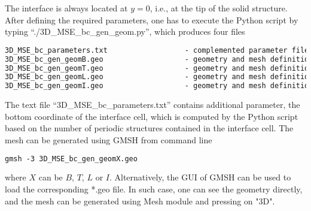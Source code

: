 \documentclass[12pt,a4paper]{article}
\begin{document}
The interface is always located at $y = 0$, i.e., at the tip of the solid structure. After defining the required parameters, one has to execute the Python script by typing ``./3D\_MSE\_bc\_gen\_geom.py'', which produces four files
\begin{lstlisting}[language=tex]
3D_MSE_bc_parameters.txt                  - complemented parameter file for FreeFem++ solver
3D_MSE_bc_gen_geomB.geo                   - geometry and mesh definition for bottom part of interface cell
3D_MSE_bc_gen_geomT.geo                   - geometry and mesh definition for top part of interface cell
3D_MSE_bc_gen_geomL.geo                   - geometry and mesh definition for Lagrange multipliers
3D_MSE_bc_gen_geomI.geo                   - geometry and mesh definition for interior cell
\end{lstlisting}
The text file ``3D\_MSE\_bc\_parameters.txt'' contains additional parameter, the bottom coordinate of the interface cell, which is computed by the Python script based on the number of periodic structures contained in the interface cell. The mesh can be generated using GMSH from command line
\begin{lstlisting}[language=tex]
gmsh -3 3D_MSE_bc_gen_geomX.geo
\end{lstlisting}
where $X$ can be $B$, $T$, $L$ or $I$. Alternatively, the GUI of GMSH can be used to load the corresponding *.geo file. In such case, one can see the geometry directly, and the mesh can be generated using Mesh module and pressing on "3D".
\end{document}
